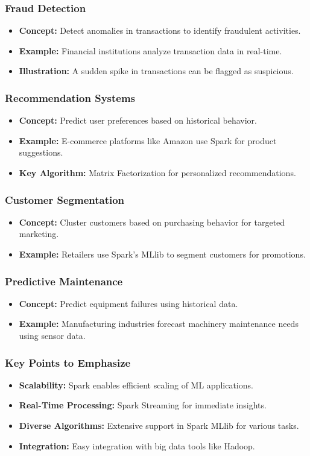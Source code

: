 \documentclass[aspectratio=169]{beamer}
\begin{document}
\begin{frame}
    \frametitle{Fraud Detection}
    \begin{itemize}
        \item \textbf{Concept:} Detect anomalies in transactions to identify fraudulent activities.
        \item \textbf{Example:} Financial institutions analyze transaction data in real-time.
        \item \textbf{Illustration:} A sudden spike in transactions can be flagged as suspicious.
    \end{itemize}
\end{frame}

\begin{frame}
    \frametitle{Recommendation Systems}
    \begin{itemize}
        \item \textbf{Concept:} Predict user preferences based on historical behavior.
        \item \textbf{Example:} E-commerce platforms like Amazon use Spark for product suggestions.
        \item \textbf{Key Algorithm:} Matrix Factorization for personalized recommendations.
    \end{itemize}
\end{frame}

\begin{frame}
    \frametitle{Customer Segmentation}
    \begin{itemize}
        \item \textbf{Concept:} Cluster customers based on purchasing behavior for targeted marketing.
        \item \textbf{Example:} Retailers use Spark's MLlib to segment customers for promotions.
    \end{itemize}
\end{frame}

\begin{frame}
    \frametitle{Predictive Maintenance}
    \begin{itemize}
        \item \textbf{Concept:} Predict equipment failures using historical data.
        \item \textbf{Example:} Manufacturing industries forecast machinery maintenance needs using sensor data.
    \end{itemize}
\end{frame}

\begin{frame}
    \frametitle{Key Points to Emphasize}
    \begin{itemize}
        \item \textbf{Scalability:} Spark enables efficient scaling of ML applications.
        \item \textbf{Real-Time Processing:} Spark Streaming for immediate insights.
        \item \textbf{Diverse Algorithms:} Extensive support in Spark MLlib for various tasks.
        \item \textbf{Integration:} Easy integration with big data tools like Hadoop.
    \end{itemize}
\end{frame}
\end{document}
